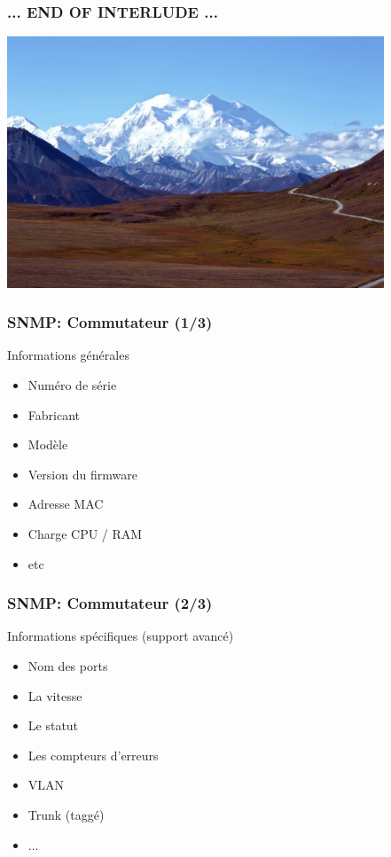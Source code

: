 \documentclass{beamer}
\begin{document}
\begin{frame}
    \frametitle{... END OF INTERLUDE ...}

    \includegraphics[height=7.5cm]{./pics/montagne.jpg}

\end{frame}



\begin{frame}
    \frametitle{SNMP: Commutateur (1/3)}

    \begin{block}{Informations générales}
    \begin{itemize}
    \item Numéro de série
    \item Fabricant
    \item Modèle
    \item Version du firmware
    \item Adresse MAC
    \item Charge CPU / RAM
    \item etc
    \end{itemize}
    \end{block}
\end{frame}

\begin{frame}
    \frametitle{SNMP: Commutateur (2/3)}

    \begin{block}{Informations spécifiques (support avancé)}
    \begin{itemize}
    \item Nom des ports 
    \item La vitesse
    \item Le statut
    \item Les compteurs d'erreurs
    \item VLAN
    \item Trunk (taggé)
    \item ...
    \end{itemize}
    \end{block}
\end{frame}
\end{document}
